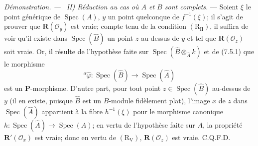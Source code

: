 \documentclass[10pt,oneside]{book}
\newenvironment{proof}{%
  \par\medskip\noindent\textit{Démonstration. ---\ }}{\par}
\begin{document}
\begin{proof}
\emph{II) Réduction au cas où $A$ et $B$ sont complets.} --- Soient $\xi$
le point générique de $\operatorname{Spec}(A)$, $y$ un point quelconque de
$f^{-1}(\xi)$; il s'agit de prouver que
$\boldsymbol R(\mathscr O_y)$ est vraie; compte tenu de la condition
$(\mathrm R_{\mathrm{II}})$, il suffira de voir qu'il existe dans
$\operatorname{Spec}(\widehat B)$ un point $z$ au-dessus de $y$ et tel que
$\boldsymbol R(\mathscr O_z)$ soit vraie. Or, il résulte de l'hypothèse
faite sur $\operatorname{Spec}(\widehat B\otimes_{\widehat A}k)$ et de
(7.5.1) que le morphisme
\enlargethispage{5\baselineskip}
\[
{}^a\widehat\varphi:\operatorname{Spec}(\widehat B)
\to\operatorname{Spec}(\widehat A)
\]
est un $\boldsymbol P$-morphisme. D'autre part, pour tout point
$z\in\operatorname{Spec}(\widehat B)$ au-dessus de $y$ (il en existe,
puisque $\widehat B$ est un $B$-module fidèlement plat), l'image $x$ de $z$
dans $\operatorname{Spec}(\widehat A)$ appartient à la fibre
$h^{-1}(\xi)$ pour le morphisme canonique
$h:\operatorname{Spec}(\widehat A)\to\operatorname{Spec}(A)$; en vertu de
l'hypothèse faite sur $A$, la propriété
$\boldsymbol R'(\mathscr O_x)$ est vraie; donc en vertu de
$(\mathrm R_{\mathrm V})$, $\boldsymbol R(\mathscr O_z)$ est vraie.
C.Q.F.D.
\end{proof}
\end{document}
